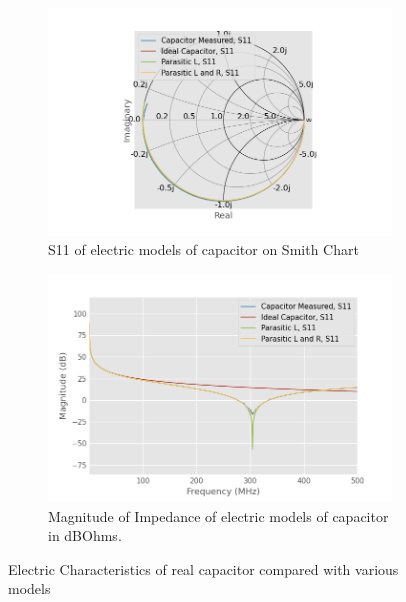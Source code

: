 \documentclass{article}
\begin{document}
\begin{figure}
    \centering
    \begin{subfigure}{\linewidth}
        \centering
        \includegraphics[width=\linewidth]{./pics/capacitor_models_smith.png}
        \caption{S11 of electric models of capacitor on Smith Chart}
        \label{fig:capacitor_compare_s}
    \end{subfigure}

    \begin{subfigure}{\linewidth}
        \centering
        \includegraphics[width=\linewidth]{./pics/capacitor_models_db.png}
        \caption{Magnitude of Impedance of electric models of capacitor in dBOhms.}
        \label{fig:capacitor_compare_z}
    \end{subfigure}
    \caption{Electric Characteristics of real capacitor compared with various models}
    \label{fig:capacitor_compare}
\end{figure}
\end{document}
